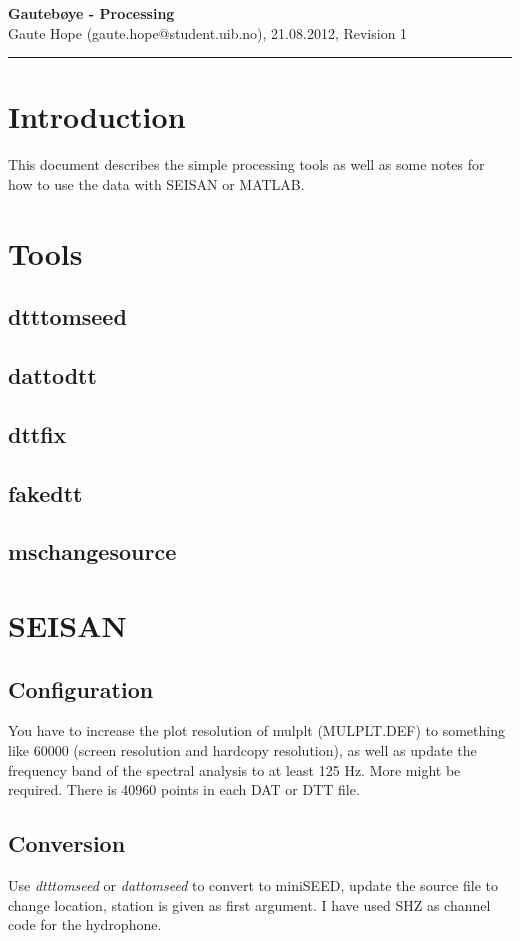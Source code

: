 \documentclass[a4paper]{article}
\newcommand{\makeheading}[2]%
        {\hspace*{-\marginparsep minus \marginparwidth}%
         \begin{minipage}[t]{\textwidth\marginparwidth\marginparsep}%
           {\large \bfseries #1}\\{#2}\\[-0.15\baselineskip]%
                 \rule{\columnwidth}{1pt}%
         \end{minipage}}
\begin{document}
\makeheading{Gautebøye - Processing}{Gaute Hope
(gaute.hope@student.uib.no), 21.08.2012, Revision 1}

\vspace{2em}
\section*{Introduction}
This document describes the simple processing tools as well as some
notes for how to use the data with SEISAN or MATLAB.

\vspace{2em}

\begin{multicols}{2}
  \section{Tools}
  \subsection{dtttomseed}
  \subsection{dattodtt}
  \subsection{dttfix}
  \subsection{fakedtt}
  \subsection{mschangesource}

  \section{SEISAN}
    \subsection{Configuration}
    You have to increase the plot resolution of mulplt (MULPLT.DEF) to something like
    60000 (screen resolution and hardcopy resolution), as well as update the
    frequency band of the spectral analysis to at least 125 Hz. More
    might be required. There is 40960 points in each DAT or DTT file.

    \subsection{Conversion}
    Use \textit{dtttomseed} or \textit{dattomseed} to convert to miniSEED, update the source
    file to change location, station is given as first argument. I have used SHZ as channel code
    for the hydrophone.


\end{multicols}
\end{document}
